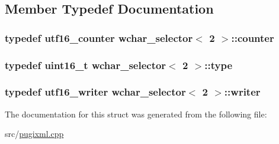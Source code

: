 \subsection{Member Typedef Documentation}
\hypertarget{structwchar__selector_3_012_01_4_a108682c81b16127f3bec2501f02cb9d8}{
\subsubsection[{counter}]{\setlength{\rightskip}{0pt plus 5cm}typedef {\bf utf16\_\-counter} wchar\_\-selector$<$ 2 $>$::{\bf counter}}}
\label{structwchar__selector_3_012_01_4_a108682c81b16127f3bec2501f02cb9d8}
\hypertarget{structwchar__selector_3_012_01_4_a60517f9b159ad60977ca7c3d2739c168}{
\subsubsection[{type}]{\setlength{\rightskip}{0pt plus 5cm}typedef uint16\_\-t wchar\_\-selector$<$ 2 $>$::{\bf type}}}
\label{structwchar__selector_3_012_01_4_a60517f9b159ad60977ca7c3d2739c168}
\hypertarget{structwchar__selector_3_012_01_4_af84979f9b8cd883798fe4e99820d6073}{
\subsubsection[{writer}]{\setlength{\rightskip}{0pt plus 5cm}typedef {\bf utf16\_\-writer} wchar\_\-selector$<$ 2 $>$::{\bf writer}}}
\label{structwchar__selector_3_012_01_4_af84979f9b8cd883798fe4e99820d6073}


The documentation for this struct was generated from the following file:\begin{DoxyCompactItemize}
\item 
src/\hyperlink{pugixml_8cpp}{pugixml.cpp}\end{DoxyCompactItemize}
